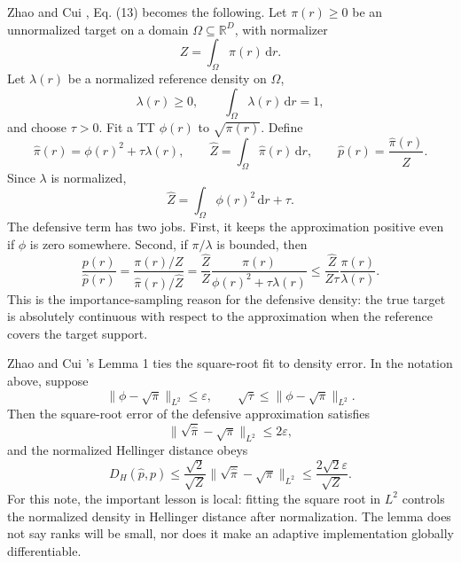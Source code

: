 \documentclass[11pt]{article}
\newcommand{\R}{\mathbb R}
\newcommand{\dd}{\,\mathrm d}
\begin{document}
Zhao and Cui \cite{zhao2024ttsequential}, Eq. (13) becomes the following.  Let \(\pi(r)\ge0\) be an
unnormalized target on a domain \(\Omega\subseteq\R^D\), with normalizer
\[
    Z=\int_\Omega \pi(r)\dd r.
\]
Let \(\lambda(r)\) be a normalized reference density on \(\Omega\),
\[
    \lambda(r)\ge0,\qquad \int_\Omega \lambda(r)\dd r=1,
\]
and choose \(\tau>0\).  Fit a TT \(\phi(r)\) to \(\sqrt{\pi(r)}\).  Define
\[
    \widehat\pi(r)
    =
    \phi(r)^2+\tau\lambda(r),
    \qquad
    \widehat Z
    =
    \int_\Omega \widehat\pi(r)\dd r,
    \qquad
    \widehat p(r)
    =
    \frac{\widehat\pi(r)}{\widehat Z}.
    \label{eq:p24-s1}
\]
Since \(\lambda\) is normalized,
\[
    \widehat Z
    =
    \int_\Omega \phi(r)^2\dd r+\tau.
    \label{eq:p24-s2}
\]
The defensive term has two jobs.  First, it keeps the approximation positive
even if \(\phi\) is zero somewhere.  Second, if \(\pi/\lambda\) is bounded, then
\[
    \frac{p(r)}{\widehat p(r)}
    =
    \frac{\pi(r)/Z}{\widehat\pi(r)/\widehat Z}
    =
    \frac{\widehat Z}{Z}
    \frac{\pi(r)}{\phi(r)^2+\tau\lambda(r)}
    \le
    \frac{\widehat Z}{Z\tau}
    \frac{\pi(r)}{\lambda(r)}.
    \label{eq:p24-s3}
\]
This is the importance-sampling reason for the defensive density: the true
target is absolutely continuous with respect to the approximation when the
reference covers the target support.

Zhao and Cui \cite{zhao2024ttsequential}'s Lemma 1 ties the square-root fit to density error.  In the notation
above, suppose
\[
    \|\phi-\sqrt{\pi}\|_{L^2}\le \varepsilon,
    \qquad
    \sqrt{\tau}\le \|\phi-\sqrt{\pi}\|_{L^2}.
    \label{eq:p24-s4}
\]
Then the square-root error of the defensive approximation satisfies
\[
    \|\sqrt{\widehat\pi}-\sqrt{\pi}\|_{L^2}\le 2\varepsilon,
    \label{eq:p24-s5}
\]
and the normalized Hellinger distance obeys
\[
    D_H(\widehat p,p)
    \le
    \frac{\sqrt{2}}{\sqrt Z}
    \|\sqrt{\widehat\pi}-\sqrt{\pi}\|_{L^2}
    \le
    \frac{2\sqrt{2}\varepsilon}{\sqrt Z}.
    \label{eq:p24-s6}
\]
For this note, the important lesson is local: fitting the square root in
\(L^2\) controls the normalized density in Hellinger distance after
normalization.  The lemma does not say ranks will be small, nor does it make an
adaptive implementation globally differentiable.

\begin{center}
\end{center}
\end{document}
